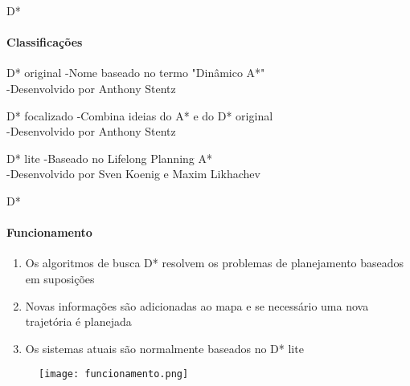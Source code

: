 \begin{frame}[t]{D*}
    \framesubtitle{Classificações}

    \begin{block}{D* original}
        -Nome baseado no termo "Dinâmico A*"\\
        -Desenvolvido por Anthony Stentz
    \end{block}

    \begin{alertblock}{D* focalizado}
        -Combina ideias do A* e do D* original\\
        -Desenvolvido por Anthony Stentz
    \end{alertblock}

    \begin{exampleblock}{D* lite}
        -Baseado no Lifelong Planning A*\\
        -Desenvolvido por Sven Koenig e Maxim Likhachev 
    \end{exampleblock}
\end{frame}
\begin{frame}[t]{D*}
    \framesubtitle{Funcionamento}
    \begin{enumerate}
        \item Os algoritmos de busca D* resolvem os problemas de planejamento baseados em suposições
        \item Novas informações são adicionadas ao mapa e se necessário uma nova trajetória é planejada
        \item Os sistemas atuais são normalmente baseados no D* lite
    \end{enumerate}

    \begin{figure}
        \texttt{[image: funcionamento.png]}
    \end{figure}
\end{frame}
